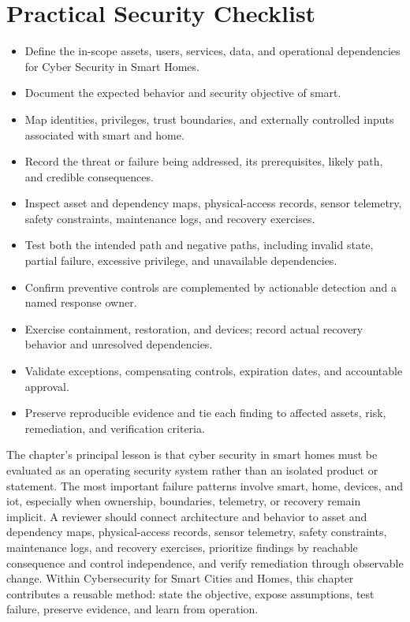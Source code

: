 \documentclass[11pt]{article}
\begin{document}
\section*{Practical Security Checklist}
\begin{itemize}[label=$\square$]
\item Define the in-scope assets, users, services, data, and operational dependencies for Cyber Security in Smart Homes.
\item Document the expected behavior and security objective of smart.
\item Map identities, privileges, trust boundaries, and externally controlled inputs associated with smart and home.
\item Record the threat or failure being addressed, its prerequisites, likely path, and credible consequences.
\item Inspect asset and dependency maps, physical-access records, sensor telemetry, safety constraints, maintenance logs, and recovery exercises.
\item Test both the intended path and negative paths, including invalid state, partial failure, excessive privilege, and unavailable dependencies.
\item Confirm preventive controls are complemented by actionable detection and a named response owner.
\item Exercise containment, restoration, and devices; record actual recovery behavior and unresolved dependencies.
\item Validate exceptions, compensating controls, expiration dates, and accountable approval.
\item Preserve reproducible evidence and tie each finding to affected assets, risk, remediation, and verification criteria.
\end{itemize}
\begin{synthesisbox}
The chapter's principal lesson is that cyber security in smart homes must be evaluated as an operating security system rather than an isolated product or statement. The most important failure patterns involve smart, home, devices, and iot, especially when ownership, boundaries, telemetry, or recovery remain implicit. A reviewer should connect architecture and behavior to asset and dependency maps, physical-access records, sensor telemetry, safety constraints, maintenance logs, and recovery exercises, prioritize findings by reachable consequence and control independence, and verify remediation through observable change. Within Cybersecurity for Smart Cities and Homes, this chapter contributes a reusable method: state the objective, expose assumptions, test failure, preserve evidence, and learn from operation.
\end{synthesisbox}
\end{document}
